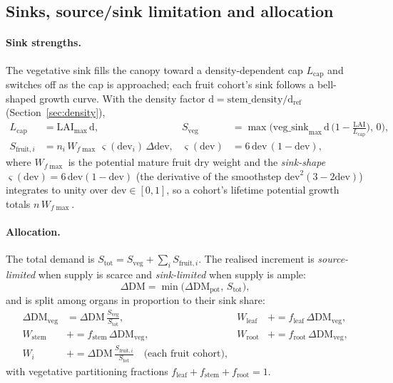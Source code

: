 \documentclass[11pt,a4paper]{article}
\begin{document}
\subsection{Sinks, source/sink limitation and allocation}\label{sec:alloc}
\paragraph{Sink strengths.} The vegetative sink fills the canopy toward a density-dependent cap
$L_{\text{cap}}$ and switches off as the cap is approached; each fruit cohort's sink follows a
bell-shaped growth curve. With the density factor $\mathrm{d}=\mathrm{stem\_density}/\mathrm{d}_{\text{ref}}$
(Section~\ref{sec:density}),
\begin{align}
  L_{\text{cap}} &= \mathrm{LAI}_{\max}\,\mathrm{d}, &
  S_{\text{veg}} &= \max\!\Big(\mathrm{veg\_sink}_{\max}\,\mathrm{d}\,\big(1-\tfrac{\mathrm{LAI}}{L_{\text{cap}}}\big),\,0\Big),\\
  S_{\text{fruit},i} &= n_i\,W_{f\max}\,\varsigma(\mathrm{dev}_i)\,\Delta\mathrm{dev}, &
  \varsigma(\mathrm{dev}) &= 6\,\mathrm{dev}\,(1-\mathrm{dev}),
\end{align}
where $W_{f\max}$ is the potential mature fruit dry weight and the \emph{sink-shape}
$\varsigma(\mathrm{dev})=6\,\mathrm{dev}(1-\mathrm{dev})$ (the derivative of the smoothstep
$\mathrm{dev}^2(3-2\mathrm{dev})$) integrates to unity over $\mathrm{dev}\in[0,1]$, so a cohort's
lifetime potential growth totals $n\,W_{f\max}$. \paragraph{Allocation.} The total demand is
$S_{\text{tot}}=S_{\text{veg}}+\sum_i S_{\text{fruit},i}$. The realised increment is
\emph{source-limited} when supply is scarce and \emph{sink-limited} when supply is ample:
\begin{equation}
  \Delta\mathrm{DM} = \min\big(\Delta\mathrm{DM}_{\text{pot}},\,S_{\text{tot}}\big),
\end{equation}
and is split among organs in proportion to their sink share:
\begin{align}
  \Delta\mathrm{DM}_{\text{veg}} &= \Delta\mathrm{DM}\,\frac{S_{\text{veg}}}{S_{\text{tot}}}, &
  W_{\text{leaf}} &\mathrel{+}= f_{\text{leaf}}\,\Delta\mathrm{DM}_{\text{veg}},\\
  W_{\text{stem}} &\mathrel{+}= f_{\text{stem}}\,\Delta\mathrm{DM}_{\text{veg}}, &
  W_{\text{root}} &\mathrel{+}= f_{\text{root}}\,\Delta\mathrm{DM}_{\text{veg}},\\
  W_i &\mathrel{+}= \Delta\mathrm{DM}\,\frac{S_{\text{fruit},i}}{S_{\text{tot}}} \quad\text{(each fruit cohort)}, &&
\end{align}
with vegetative partitioning fractions $f_{\text{leaf}}+f_{\text{stem}}+f_{\text{root}}=1$.
\end{document}

